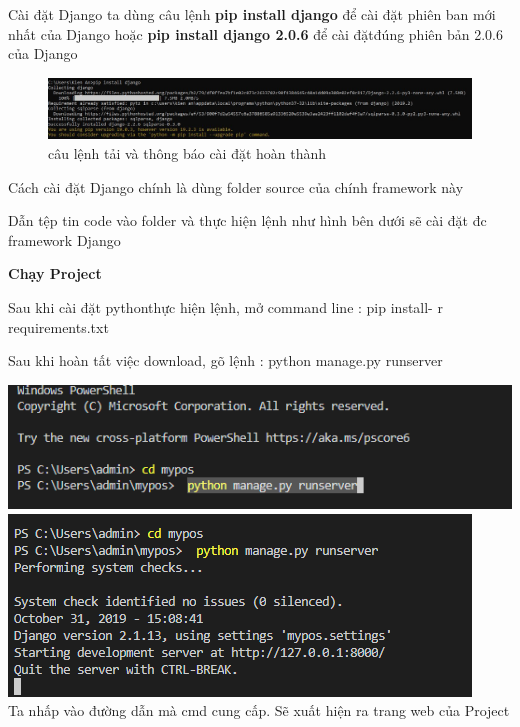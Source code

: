 \documentclass{article}
\begin{document}
Cài đặt Django ta dùng câu lệnh \textbf{pip install django} để cài đặt phiên ban mới nhất của Django hoặc \textbf{pip install django 2.0.6} để cài đặtđúng phiên bản 2.0.6 của Django

     \begin{figure}[htp]
        \centering
        \includegraphics[scale=0.5]{13.jpg}
        \caption{câu lệnh tải và thông báo cài đặt hoàn thành}
    \end{figure}

Cách cài đặt Django chính là dùng folder source của chính framework này
	
Dẫn tệp tin code vào folder và thực hiện lệnh như hình bên dưới sẽ cài đặt đc framework Django

\fontsize{14}{20}\selectfont\textbf{Chạy Project}

\fontsize{13}{20}\selectfont

Sau khi cài đặt pythonthực hiện lệnh, mở command line : pip install- r requirements.txt  

Sau khi hoàn tất việc download, gõ lệnh : python manage.py runserver

\includegraphics[scale = 0.6]{13.png} \\

\includegraphics[scale = 0.6]{14.png}\\

Ta nhấp vào đường dẫn mà cmd cung cấp. Sẽ xuất hiện ra trang web của Project\\
\end{document}
